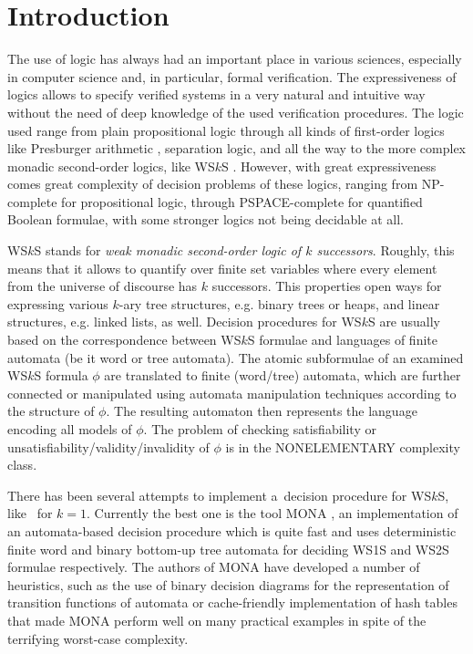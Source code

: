 \chapter{Introduction}
 
The use of logic has always had an important place in various sciences,
especially in computer science and, in particular, formal verification. The
expressiveness of logics allows to specify verified systems in a very natural
and intuitive way without the need of deep knowledge of the used verification
procedures. The logic used range from plain propositional logic through all
kinds of first-order logics like Presburger arithmetic \cite{presburger},
separation logic, and all the way to the more complex monadic second-order
logics, like WS$k$S \cite{wsks}. However, with great expressiveness comes great
complexity of decision problems of these logics, ranging from NP-complete for
propositional logic, through PSPACE-complete for quantified Boolean formulae,
with some stronger logics not being decidable at all.

WS$k$S stands for \emph{weak monadic second-order logic of $k$ successors}.
Roughly, this means that it allows to quantify over finite set variables where
every element from the universe of discourse has $k$ successors. This properties
open ways for expressing various $k$-ary tree structures, e.g. binary trees or
heaps, and linear structures, e.g. linked lists, as well. Decision procedures
for WS$k$S are usually based on the correspondence between WS$k$S formulae and
languages of finite automata (be it word or tree automata). The atomic
subformulae of an
examined WS$k$S formula $\phi$ are translated to finite (word/tree)
automata, which are further connected or manipulated using automata manipulation
techniques according to the structure of $\phi$. The resulting automaton then
represents the language encoding all models of $\phi$. The problem of checking
satisfiability or unsatisfiability/validity/invalidity of $\phi$ is in the
NONELEMENTARY complexity class.

There has been several attempts to implement a~decision procedure for WS$k$S,
like~\cite{nfa} for $k = 1$. Currently the best one is the tool \textsc{MONA}
\cite{mona}, an implementation of an automata-based decision procedure which is
quite fast and uses deterministic finite word and binary bottom-up tree automata
for deciding WS1S and WS2S formulae respectively. The authors of \textsc{MONA}
have developed a number of heuristics, such as the use of binary decision
diagrams for the representation of transition functions of automata or
cache-friendly implementation of hash tables that made \textsc{MONA} perform
well on many practical examples in spite of the terrifying worst-case
complexity.

